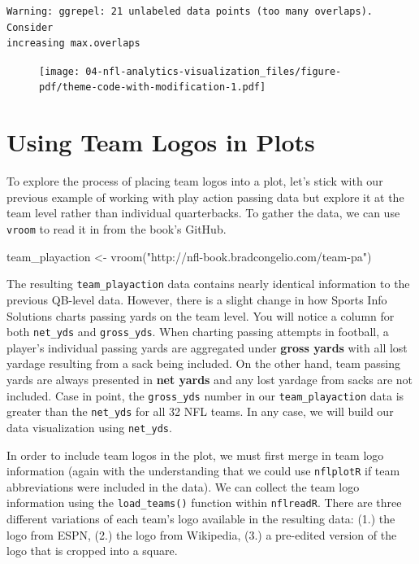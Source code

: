 \documentclass[
  letterpaper,
]{krantz}
\newenvironment{Shaded}{\begin{snugshade}}{\end{snugshade}}
\newcommand{\FunctionTok}[1]{\textcolor[rgb]{0.28,0.35,0.67}{#1}}
\newcommand{\NormalTok}[1]{\textcolor[rgb]{0.00,0.23,0.31}{#1}}
\newcommand{\OtherTok}[1]{\textcolor[rgb]{0.00,0.23,0.31}{#1}}
\newcommand{\StringTok}[1]{\textcolor[rgb]{0.13,0.47,0.30}{#1}}
\begin{document}
\begin{verbatim}
Warning: ggrepel: 21 unlabeled data points (too many overlaps). Consider
increasing max.overlaps
\end{verbatim}

\begin{figure}[H]

{\centering \texttt{[image: 04-nfl-analytics-visualization\_files/figure-pdf/theme-code-with-modification-1.pdf]}

}

\end{figure}

\hypertarget{using-team-logos-in-plots}{%
\section{Using Team Logos in Plots}\label{using-team-logos-in-plots}}

To explore the process of placing team logos into a plot, let's stick
with our previous example of working with play action passing data but
explore it at the team level rather than individual quarterbacks. To
gather the data, we can use \texttt{vroom} to read it in from the book's
GitHub.

\begin{Shaded}
\begin{Highlighting}[]
\NormalTok{team\_playaction }\OtherTok{\textless{}{-}} \FunctionTok{vroom}\NormalTok{(}\StringTok{"http://nfl{-}book.bradcongelio.com/team{-}pa"}\NormalTok{)}
\end{Highlighting}
\end{Shaded}

The resulting \texttt{team\_playaction} data contains nearly identical
information to the previous QB-level data. However, there is a slight
change in how Sports Info Solutions charts passing yards on the team
level. You will notice a column for both \texttt{net\_yds} and
\texttt{gross\_yds}. When charting passing attempts in football, a
player's individual passing yards are aggregated under \textbf{gross
yards} with all lost yardage resulting from a sack being included. On
the other hand, team passing yards are always presented in \textbf{net
yards} and any lost yardage from sacks are not included. Case in point,
the \texttt{gross\_yds} number in our \texttt{team\_playaction} data is
greater than the \texttt{net\_yds} for all 32 NFL teams. In any case, we
will build our data visualization using \texttt{net\_yds}.

In order to include team logos in the plot, we must first merge in team
logo information (again with the understanding that we could use
\texttt{nflplotR} if team abbreviations were included in the data). We
can collect the team logo information using the \texttt{load\_teams()}
function within \texttt{nflreadR}. There are three different variations
of each team's logo available in the resulting data: (1.) the logo from
ESPN, (2.) the logo from Wikipedia, (3.) a pre-edited version of the
logo that is cropped into a square.
\end{document}
